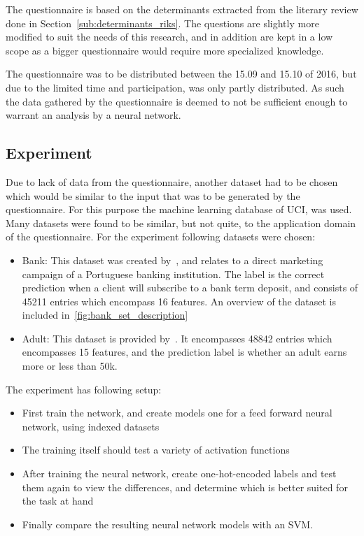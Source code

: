 \documentclass[12pt]{article}
\begin{document}
The questionnaire  is based on the determinants extracted from the literary review done in Section~\ref{sub:determinants_riks}. The questions are slightly more modified to suit the needs of this research, and in addition are kept in a low scope as a bigger questionnaire would require more specialized knowledge.

The questionnaire was to be distributed between the 15.09 and 15.10 of 2016,  but due to the limited time and participation, was only partly distributed. As such the data gathered by the questionnaire is deemed to not be sufficient enough to warrant an analysis by a neural network.

\subsection{Experiment}

Due to lack of data from the questionnaire, another dataset had to be chosen which would be similar to the input that was to be generated by the questionnaire. For this purpose the machine learning database of UCI, was used. Many datasets were found to be similar, but not quite, to the application domain of the questionnaire. For the experiment following datasets were chosen:

\begin{itemize}
    \item Bank: This dataset was created by~\cite{bank.names}, and relates to a direct marketing campaign of a Portuguese banking institution. The label is the correct prediction when a client will subscribe to a bank term deposit, and consists of 45211 entries which encompass 16 features. An overview of the dataset is included in~\ref{fig:bank_set_description}
    \item Adult: This dataset is provided by~\cite{adult.names}. It encompasses 48842 entries which encompasses 15 features, and the prediction label is whether an adult earns more or less than 50k.
\end{itemize}

The experiment has following setup:
\begin{itemize}
    \item First train the network, and create models one for a feed forward neural network, using indexed datasets
    \item The training itself should test a variety of activation functions
    \item After training the neural network, create one-hot-encoded labels and test them again to view the differences, and determine which is better suited for the task at hand
    \item Finally compare the resulting neural network models with an SVM\@.
\end{itemize}
\end{document}
